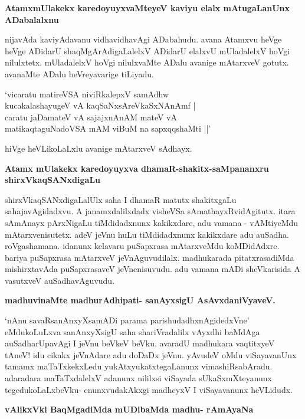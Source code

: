 {\bigskip
\noindent
{\large\bf AtamxmUlakekx karedoyuyxvaMteyeV kaviyu elalx mAtugaLanUnx ADa\break\-balalxnu}}\label{page237}
\medskip

\noindent
nijavAda kaviyAdavanu vidhavidhavAgi ADabahudu. avana Atamxvu heVge heVge ADidarU shaqMgA\-rAdigaLalelxV ADidarU elalxvU mUladalelxV hoVgi nilulxtetx. mUladalelxV hoVgi nilulxvaMte ADalu avanige mAtarxveV gotutx. avanaMte ADalu beVreyavarige tiLiyadu.

\smallskip
\begin{shloka}
`vicaratu matireVSA niviRkalepxV samAdhw \\\label{237}
kucakalashayugeV vA kaqSaNxsAreVkaSxNAnAmf |\\
caratu jaDamateV vA sajajxnAnAM mateV vA \\
matikaqtaguNadoVSA mAM viBuM na sapxqqshaMti ||'
\end{shloka}

\noindent
hiVge heVLikoLaLxlu avanige mAtarxveV sAdhayx.

{\bigskip
\noindent
{\large\bf Atamx mUlakekx karedoyuyxva dhamaR-shakitx-saMpananxru shirxVkaqSANxdigaLu}}\label{page237}
\medskip

\noindent
shirxVkaqSANxdigaLalUlx saha I dhamaR matutx shakitxgaLu sahajavAgidadxvu. A janamxdalilxdadx visheVSa sAmathayxR\-vidAgitutx. itara sAmAnayx pArxNigaLu tiMdidadxnunx kakikxdare, adu vamana - vAMtiyeMdu mAtarxvenisutetx. adeV jeVnu huLu tiMdidadxnunx kakikxdare adu auSadha. roVgashamana. idanunx kelavaru puSapxrasa mAtarxveMdu koMDidAdxre. bariya puSapxrasa mAtarxveV jeVnAguvudilalx. madhukarada pitatxrasadiMda mishirxtavAda puSapx\-rasaveV jeVnenisuvudu. adu vamana mADi sheVkarisida A vasutxveV auSadhavAguvudu.

{\bigskip
\noindent
{\large\bf madhuvinaMte madhurAdhipati- sanAyxsigU AsAvxdaniVyaveV.}}\label{page238}
\medskip

\noindent
`nAnu savaRsanAnxyXsamADi parama parishudadhxnAgidedxVne' eMdukoLuLxva sanAnxyXsigU saha shariVradalilx vAyxdhi baMdAga auSadharUpavAgi I jeVnu beVkeV beVku. avaradU madhukara vaqtitxyeV tAneV! idu cikakx jeVnAdare adu doDaDx jeVnu. yAvudeV oMdu viSayavanUnx tamamx maTaTxkekxLedu yukAtxyukatxtegaLanunx vimashiRsabAradu. adaradara maTaTxdalelxV adanunx nililxsi viSayada sUkaSxmXteyanunx tegedukoLaLxbeVku- enunxvudakAkxgi madheyxV I viSayavanunx heVLidudx.

\newpage
{\noindent
{\large\bf vAlikxVki BaqMgadiMda mUDibaMda madhu- rAmAyaNa}}\label{page238}
\medskip

